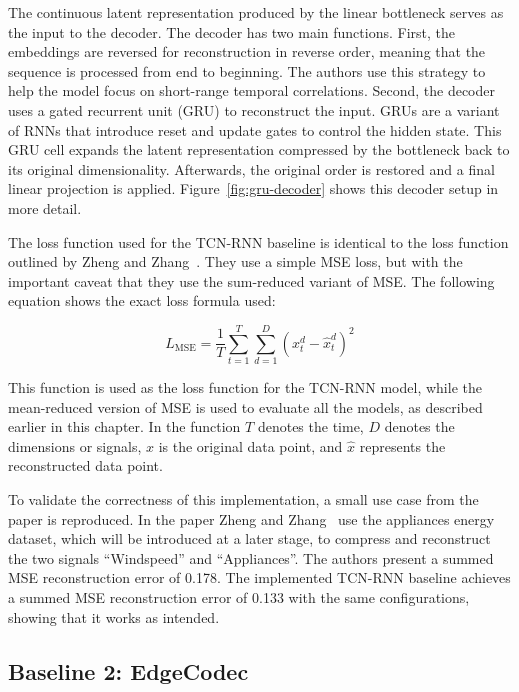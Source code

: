 The continuous latent representation produced by the linear bottleneck serves as the input to the decoder. The decoder has two main functions. First, the embeddings are reversed for reconstruction in reverse order, meaning that the sequence is processed from end to beginning. The authors use this strategy to help the model focus on short-range temporal correlations. Second, the decoder uses a gated recurrent unit (GRU) to reconstruct the input. GRUs are a variant of RNNs that introduce reset and update gates to control the hidden state. This GRU cell expands the latent representation compressed by the bottleneck back to its original dimensionality. Afterwards, the original order is restored and a final linear projection is applied. Figure~\ref{fig:gru-decoder} shows this decoder setup in more detail.

The loss function used for the TCN-RNN baseline is identical to the loss function outlined by Zheng and Zhang~\cite{Zheng2023}. They use a simple MSE loss, but with the important caveat that they use the sum-reduced variant of MSE. The following equation shows the exact loss formula used: 

\begin{equation}
L_{\mathrm{MSE}} = \frac{1}{T} \sum_{t=1}^{T} \sum_{d=1}^{D} \left( x_t^d - \hat{x}_t^d \right)^2
\end{equation}

This function is used as the loss function for the TCN-RNN model, while the mean-reduced version of MSE is used to evaluate all the models, as described earlier in this chapter. In the function $T$ denotes the time, $D$ denotes the dimensions or signals, $x$ is the original data point, and $\hat{x}$ represents the reconstructed data point. 

To validate the correctness of this implementation, a small use case from the paper is reproduced. In the paper Zheng and Zhang~\cite{Zheng2023} use the appliances energy dataset, which will be introduced at a later stage, to compress and reconstruct the two signals ``Windspeed'' and ``Appliances''. The authors present a summed MSE reconstruction error of 0.178. The implemented TCN-RNN baseline achieves a summed MSE reconstruction error of 0.133 with the same configurations, showing that it works as intended.  

\subsection{Baseline 2: EdgeCodec}

